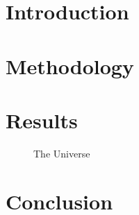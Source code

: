 \documentclass{article}
\title{}
\author{Sui Jiet Tay}
\date{}
\begin{document}
\maketitle

\begin{abstract}
\end{abstract}

\begin{multicols}{2}
\section{Introduction}

\section{Methodology}

\section{Results}

\begin{figure}[h!]
\centering
\caption{The Universe}
\label{fig:universe}
\end{figure}

\section{Conclusion}



\end{multicols}
\end{document}
